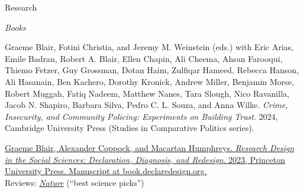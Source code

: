 \documentclass[10.9pt]{article}
\makeatletter
\newcommand\donotbreakhere{\par\nobreak\@afterheading\vspace{1em}}
\makeatother
\begin{document}
{\large Research}\donotbreakhere
{\large\it \hspace{.15em} Books}
\begin{etaremune}
\item Graeme Blair, Fotini Christia, and Jeremy M. Weinstein (eds.) with Eric Arias, Emile Badran, Robert A. Blair, Ellen Chapin, Ali Cheema, Ahsan Farooqui, Thiemo Fetzer, Guy Grossman, Dotan Haim, Zulfiqar Hameed, Rebecca Hanson, Ali Hasanain, Ben Kachero, Dorothy Kronick, Andrew Miller, Benjamin Morse, Robert Muggah, Fatiq Nadeem, Matthew Nanes, Tara Slough, Nico Ravanilla, Jacob N. Shapiro, Barbara Silva, Pedro C. L. Souza, and Anna Wilke. {\it Crime, Insecurity, and Community Policing: Experiments on Building Trust}. 2024, Cambridge University Press (Studies in Comparative Politics series).
\item \href{https://book.declaredesign.org}{Graeme Blair, Alexander Coppock, and Macartan Humphreys. {\it Research Design in the Social Sciences: Declaration, Diagnosis, and Redesign}. 2023, Princeton University Press. Manuscript at book.declaredesign.org.}\\[0.35em] 
Reviews: \textit{\href{https://www.nature.com/articles/d41586-023-03591-5}{Nature}} (``best science picks'')
\end{etaremune}
\vspace{1em}
\end{document}
